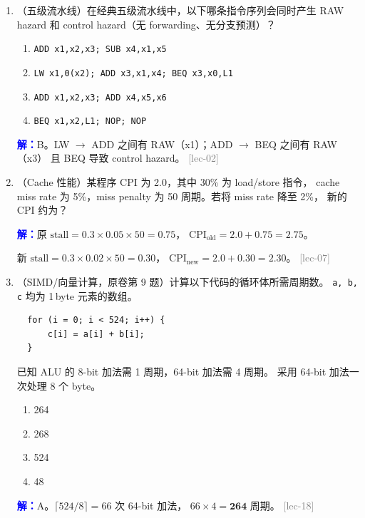 \documentclass[11pt,a4paper]{article}
\newcommand{\ans}{\par\noindent\textcolor{blue}{\textbf{解：}}}
\newcommand{\lec}[1]{\textcolor{gray}{[lec-#1]}}
\begin{document}
\begin{enumerate}[leftmargin=*,itemsep=8pt]
  \ans B。写分配：write miss 时先将 block 读入 Cache，再修改。
  写回：只更新 Cache（标 dirty），替换时才写回主存。 \lec{05}

\item （五级流水线）在经典五级流水线中，以下哪条指令序列会同时产生
  RAW hazard 和 control hazard（无 forwarding、无分支预测）？

  \begin{enumerate}[label=\Alph*.]
    \item \texttt{ADD x1,x2,x3; SUB x4,x1,x5}
    \item \texttt{LW x1,0(x2); ADD x3,x1,x4; BEQ x3,x0,L1}
    \item \texttt{ADD x1,x2,x3; ADD x4,x5,x6}
    \item \texttt{BEQ x1,x2,L1; NOP; NOP}
  \end{enumerate}

  \ans B。LW $\to$ ADD 之间有 RAW（x1）；ADD $\to$ BEQ 之间有 RAW（x3）
  且 BEQ 导致 control hazard。 \lec{02}

\item （Cache 性能）某程序 CPI 为 2.0，其中 30\% 为 load/store 指令，
  cache miss rate 为 5\%，miss penalty 为 50 周期。若将 miss rate 降至 2\%，
  新的 CPI 约为？

  \ans $\text{原 stall} = 0.3 \times 0.05 \times 50 = 0.75$，
  $\text{CPI}_\text{old} = 2.0 + 0.75 = 2.75$。

  $\text{新 stall} = 0.3 \times 0.02 \times 50 = 0.30$，
  $\text{CPI}_\text{new} = 2.0 + 0.30 = \mathbf{2.30}$。 \lec{07}

\item （SIMD/向量计算，原卷第 9 题）计算以下代码的循环体所需周期数。
  \texttt{a, b, c} 均为 1\,byte 元素的数组。

  \begin{verbatim}
  for (i = 0; i < 524; i++) {
      c[i] = a[i] + b[i];
  }
  \end{verbatim}

  已知 ALU 的 8-bit 加法需 1 周期，64-bit 加法需 4 周期。
  采用 64-bit 加法一次处理 8 个 byte。

  \begin{enumerate}[label=\Alph*.]
    \item 264
    \item 268
    \item 524
    \item 48
  \end{enumerate}

  \ans A。$\lceil 524 / 8 \rceil = 66$ 次 64-bit 加法，
  $66 \times 4 = \mathbf{264}$ 周期。 \lec{18}


\end{enumerate}
\end{document}
